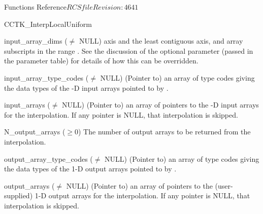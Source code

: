 \begin{cactuspart}{ Functions Reference}{$RCSfile$}{$Revision: 4641 $}
\begin{FunctionDescription}{CCTK\_InterpLocalUniform}
\begin{ParameterSection}
\begin{Parameter}{input\_array\_dims ($\ne$ NULL)}
axis and \code{[N\_dims-1]} the least contiguous axis, and array subscripts
in the range .  See the
discussion of the  optional parameter (passed
in the parameter table) for details of how this can be overridden.
\end{Parameter}
\begin{Parameter}{input\_array\_type\_codes ($\ne$ NULL)}
\hbox{}
(Pointer to) an array of  
type codes giving the data types of the -D input arrays
pointed to by .
\end{Parameter}
\begin{Parameter}{input\_arrays ($\ne$ NULL)}
\hbox{}
(Pointer to) an array of  pointers to the
-D input arrays for the interpolation.  If any
 pointer is NULL, that interpolation is skipped.
\end{Parameter}
\begin{Parameter}{N\_output\_arrays ($\ge 0$)}
\hbox{}
The number of output arrays to be returned from the interpolation.
\end{Parameter}
\begin{Parameter}{output\_array\_type\_codes ($\ne$ NULL)}
\hbox{}
(Pointer to) an array of  
type codes giving the data types of the 1-D output arrays pointed to by
.
\end{Parameter}
\begin{Parameter}{output\_arrays ($\ne$ NULL)}
\hbox{}
(Pointer to) an array of  pointers to the
(user-supplied) 1-D output arrays for the interpolation.  If any
 pointer is NULL, that interpolation is skipped.
\end{Parameter}
\end{ParameterSection}


\end{FunctionDescription}
\end{cactuspart}
